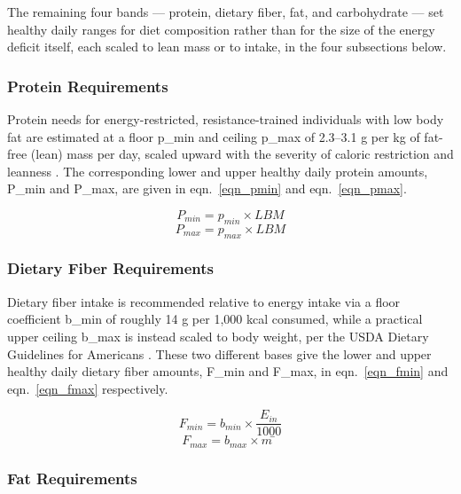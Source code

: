 The remaining four bands — protein, dietary fiber, fat, and carbohydrate — set healthy daily ranges for diet composition rather than for the size of the energy deficit itself, each scaled to lean mass or to intake, in the four subsections below.

\subsubsection{Protein Requirements}

Protein needs for energy-restricted, resistance-trained individuals with low body fat are estimated at a floor p\_min and ceiling p\_max of 2.3–3.1 g per kg of fat-free (lean) mass per day, scaled upward with the severity of caloric restriction and leanness \cite{ref_helms2014}. The corresponding lower and upper healthy daily protein amounts, P\_min and P\_max, are given in eqn.~\eqref{eqn_pmin} and eqn.~\eqref{eqn_pmax}.

\begin{equation}
\label{eqn_pmin}
P_{min} = p_{min} × LBM
\end{equation}
\begin{equation}
\label{eqn_pmax}
P_{max} = p_{max} × LBM
\end{equation}

\subsubsection{Dietary Fiber Requirements}

Dietary fiber intake is recommended relative to energy intake via a floor coefficient b\_min of roughly 14 g per 1,000 kcal consumed, while a practical upper ceiling b\_max is instead scaled to body weight, per the USDA Dietary Guidelines for Americans \cite{ref_usda2020}. These two different bases give the lower and upper healthy daily dietary fiber amounts, F\_min and F\_max, in eqn.~\eqref{eqn_fmin} and eqn.~\eqref{eqn_fmax} respectively.

\begin{equation}
\label{eqn_fmin}
F_{min} = b_{min} × \frac{E_{in}}{1000}
\end{equation}
\begin{equation}
\label{eqn_fmax}
F_{max} = b_{max} × m̄
\end{equation}

\subsubsection{Fat Requirements}

